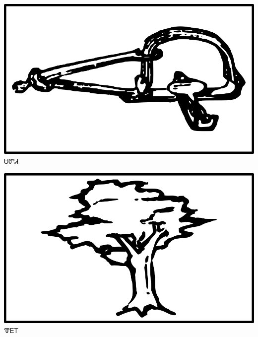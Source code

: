 \documentclass[avery5371]{flashcards}%
\begin{document}
    \begin{flashcard}{
        \includegraphics[width=0.95\columnwidth,height=.51\columnwidth,keepaspectratio]{../artwork/objects-neutral/sadvdi}
    }
        \Huge ᏌᏛᏗ
    \end{flashcard}

    \begin{flashcard}{
        \includegraphics[width=0.95\columnwidth,height=.51\columnwidth,keepaspectratio]{../artwork/objects-rod/hlgv}
    }
        \Huge ᏡᎬᎢ
    \end{flashcard}
\end{document}
